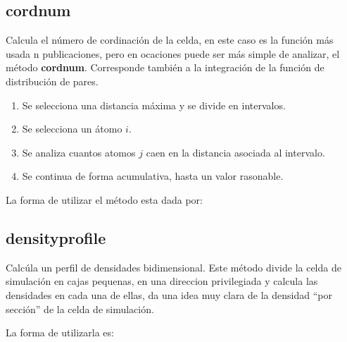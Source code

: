\subsection{cordnum}
Calcula el n\'umero de cordinaci\'on de la celda, en este caso es la funci\'on
m\'as usada n publicaciones, pero en ocaciones puede ser m\'as simple de
analizar, el m\'etodo \textbf{cordnum}. Corresponde tambi\'en a la integraci\'on
de la funci\'on de distribuci\'on de pares.
\begin{enumerate}
 \item Se selecciona una distancia m\'axima y se divide en intervalos.
 \item Se selecciona un \'atomo $i$.
 \item Se analiza cuantos atomos $j$ caen en la distancia asociada al intervalo.
 \item Se continua de forma acumulativa, hasta un valor rasonable.
\end{enumerate}

La forma de utilizar el m\'etodo esta dada por:


\subsection{densityprofile}
Calc\'ula un perfil de densidades bidimensional. Este m\'etodo divide la celda
de simulaci\'on en cajas pequenas, en una direccion privilegiada y calcula las
densidades en cada una de ellas, da una idea muy clara de la densidad ``por
secci\'on'' de la celda de simulaci\'on.

La forma de utilizarla es:



